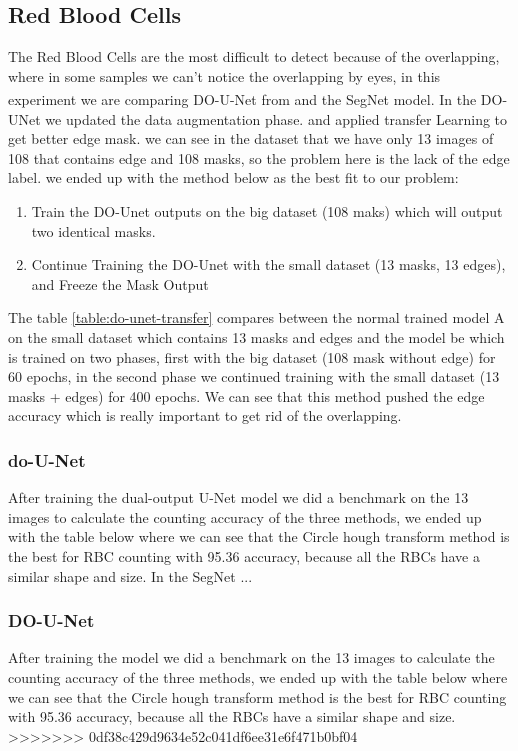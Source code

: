\subsection{Red Blood Cells}
The Red Blood Cells are the most difficult to detect because of the overlapping, where in some samples we can't notice the overlapping by eyes, in this experiment we are comparing DO-U-Net from \textsuperscript{\cite{10.1007/978-3-030-44584-3_31}} and the SegNet model.
In the DO-UNet we updated the data augmentation phase. and applied transfer Learning to get better edge mask. we can see in the dataset that we have only 13 images of 108 that contains edge and 108 masks, so the problem here is the lack of the edge label. we ended up with the method below as the best fit to our problem:
\begin{enumerate}
    \item Train the DO-Unet outputs on the big dataset (108 maks) which will output two identical masks.
    \item Continue Training the DO-Unet with the small dataset (13 masks, 13 edges), and Freeze the Mask Output
\end{enumerate}



The table \ref{table:do-unet-transfer} compares between the normal trained model A on the small dataset which contains 13 masks and edges and the model be which is trained on two phases, first with the big dataset (108 mask without edge) for 60 epochs, in the second phase we continued training with the small dataset (13 masks + edges) for 400 epochs.
We can see that this method pushed the edge accuracy which is really important to get rid of the overlapping.

\subsubsection{do-U-Net}
After training the dual-output U-Net model we did a benchmark on the 13 images to calculate the counting accuracy of the three methods, we ended up with the table below where we can see that the Circle hough transform method is the best for RBC counting with 95.36 accuracy, because all the RBCs have a similar shape and size.
In the SegNet ... %

\subsubsection{DO-U-Net}
After training the model we did a benchmark on the 13 images to calculate the counting accuracy of the three methods, we ended up with the table below where we can see that the Circle hough transform method is the best for RBC counting with 95.36 accuracy, because all the RBCs have a similar shape and size.
>>>>>>> 0df38c429d9634e52c041df6ee31e6f471b0bf04

